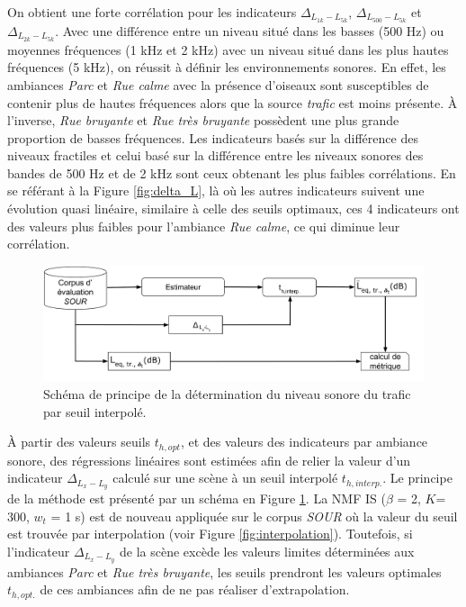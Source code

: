 On obtient une forte corrélation pour les indicateurs $\Delta_{L_{1k}-L_{5k}}$, $\Delta_{L_{500}-L_{5k}}$ et $\Delta_{L_{2k}-L_{5k}}$. Avec une différence entre un niveau situé dans les basses (500 Hz) ou moyennes fréquences (1 kHz et 2 kHz) avec un niveau situé dans les plus hautes fréquences (5 kHz), on réussit à définir les environnements sonores. En effet, les ambiances \textit{Parc} et \textit{Rue calme} avec la présence d'oiseaux sont susceptibles de contenir plus de hautes fréquences alors que la source \textit{trafic} est moins présente. À l'inverse, \textit{Rue bruyante} et \textit{Rue très bruyante} possèdent une plus grande proportion de basses fréquences. 
Les indicateurs basés sur la différence des niveaux fractiles et celui basé sur la différence entre les niveaux sonores des bandes de 500 Hz et de 2 kHz sont ceux obtenant les plus faibles corrélations. En se référant à la Figure \ref{fig:delta_L}, là où les autres indicateurs suivent une évolution quasi linéaire, similaire à celle des seuils optimaux, ces 4 indicateurs ont des valeurs plus faibles pour l'ambiance \textit{Rue calme}, ce qui diminue leur corrélation.

\begin{figure}[h]
\centering
\includegraphics[width=.9\linewidth]{./figures/NMF/bloc_diagram_interpolation.pdf}
\caption{Schéma de principe de la détermination du niveau sonore du trafic par seuil interpolé.}
\label{fig:schema_NMFIS_interp}
\end{figure}

À partir des valeurs seuils $t_{h,opt}$, et des valeurs des indicateurs par ambiance sonore, des régressions linéaires sont estimées afin de relier la valeur d'un indicateur $\Delta_{L_x-L_y}$ calculé sur une scène à un seuil interpolé $t_{h,interp.}$. Le principe de la méthode est présenté par un schéma en Figure \ref{fig:schema_NMFIS_interp}.
La NMF IS ($\beta$ = 2, $K$= 300, $w_t$ = 1 s) est de nouveau appliquée sur le corpus \textit{SOUR} où la valeur du seuil est trouvée par interpolation (voir Figure \ref{fig:interpolation}). 
Toutefois, si l'indicateur $\Delta_{L_x-L_y}$ de la scène excède les valeurs limites déterminées aux ambiances \textit{Parc} et \textit{Rue très bruyante}, les seuils prendront les valeurs optimales $t_{h,opt.}$ de ces ambiances afin de ne pas réaliser d'extrapolation.  


